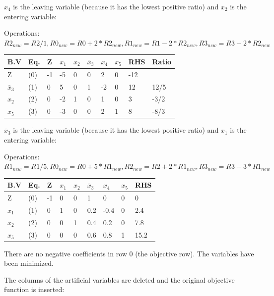 \documentclass{article}
\begin{document}
\vspace{5mm}
$x_4$ is the leaving variable (because it has the lowest positive ratio) and $x_2$ is the entering variable:

Operations: $R2_{new}=R2/1, R0_{new}=R0+2*R2_{new}, R1_{new}=R1-2*R2_{new}, R3_{new}=R3+2*R2_{new}$

\vspace{5mm}
\begin{tabular}{|l|l|l|l l l l l|l|l|}
  \hline
  B.V             & Eq. & Z & $x_1$ & $x_2$ & $\overline{x}_3$ & $x_4$ & $x_5$  & RHS & Ratio\\ \hline
  Z               & (0) & -1& -5 & 0  & 0  & 2  & 0   & -12 & \\ \hline
  $\overline{x}_3$& (1) & 0 & 5  & 0  & 1  & -2 & 0   & 12  & 12/5\\ \hline
  $x_2$           & (2) & 0 & -2 & 1  & 0  & 1  & 0   & 3   & -3/2\\ \hline
  $x_5$           & (3) & 0 & -3 & 0  & 0  & 2  & 1   & 8   & -8/3\\ \hline
\end{tabular}


\vspace{5mm}
$\overline{x}_3$ is the leaving variable (because it has the lowest positive ratio) and $x_1$ is the entering variable:

Operations: $R1_{new}=R1/5, R0_{new}=R0+5*R1_{new}, R2_{new}=R2+2*R1_{new}, R3_{new}=R3+3*R1_{new}$

\vspace{5mm}
\begin{tabular}{|l|l|l|l l l l l|l|}
  \hline
  B.V             & Eq. & Z & $x_1$ & $x_2$ & $\overline{x}_3$ & $x_4$ & $x_5$  & RHS\\ \hline
  Z               & (0) & -1& 0  & 0  & 1  & 0  & 0   & 0    \\ \hline
  $x_1$           & (1) & 0 & 1  & 0  & 0.2&-0.4& 0   & 2.4  \\ \hline
  $x_2$           & (2) & 0 & 0  & 1  & 0.4& 0.2& 0   & 7.8 \\ \hline
  $x_5$           & (3) & 0 & 0  &  0 & 0.6& 0.8& 1   & 15.2 \\ \hline
\end{tabular}

\vspace{5mm}
There are no negative coefficients in row 0 (the objective row). The variables have been minimized.

The columns of the artificial variables are deleted and the original objective function is inserted:
\end{document}
